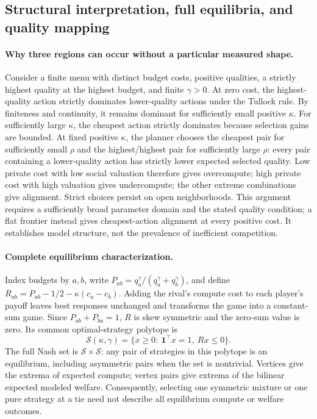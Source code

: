 \documentclass{article}
\begin{document}
\subsection{Structural interpretation, full equilibria, and quality mapping}
\label{app:completeequilibria}

\paragraph{Why three regions can occur without a particular measured shape.}
Consider a finite menu with distinct budget costs, positive qualities, a strictly highest quality at the highest budget, and finite $\gamma>0$. At zero cost, the highest-quality action strictly dominates lower-quality actions under the Tullock rule. By finiteness and continuity, it remains dominant for sufficiently small positive $\kappa$. For sufficiently large $\kappa$, the cheapest action strictly dominates because selection gains are bounded. At fixed positive $\kappa$, the planner chooses the cheapest pair for sufficiently small $\rho$ and the highest/highest pair for sufficiently large $\rho$: every pair containing a lower-quality action has strictly lower expected selected quality. Low private cost with low social valuation therefore gives overcompute; high private cost with high valuation gives undercompute; the other extreme combinations give alignment. Strict choices persist on open neighborhoods. This argument requires a sufficiently broad parameter domain and the stated quality condition; a flat frontier instead gives cheapest-action alignment at every positive cost. It establishes model structure, not the prevalence of inefficient competition.

\paragraph{Complete equilibrium characterization.}
Index budgets by $a,b$, write $P_{ab}=q_a^\gamma/(q_a^\gamma+q_b^\gamma)$, and define $R_{ab}=P_{ab}-1/2-\kappa(c_a-c_b)$. Adding the rival's compute cost to each player's payoff leaves best responses unchanged and transforms the game into a constant-sum game. Since $P_{ab}+P_{ba}=1$, $R$ is skew symmetric and the zero-sum value is zero. Its common optimal-strategy polytope is
\begin{equation}
 \mathcal S(\kappa,\gamma)=\{x\geq0:\ \mathbf 1^\top x=1,\ Rx\leq0\}.
 \label{eq:equilibriumpolytope}
\end{equation}
The full Nash set is $\mathcal S\times\mathcal S$: any pair of strategies in this polytope is an equilibrium, including asymmetric pairs when the set is nontrivial. Vertices give the extrema of expected compute; vertex pairs give extrema of the bilinear expected modeled welfare. Consequently, selecting one symmetric mixture or one pure strategy at a tie need not describe all equilibrium compute or welfare outcomes.
\end{document}
